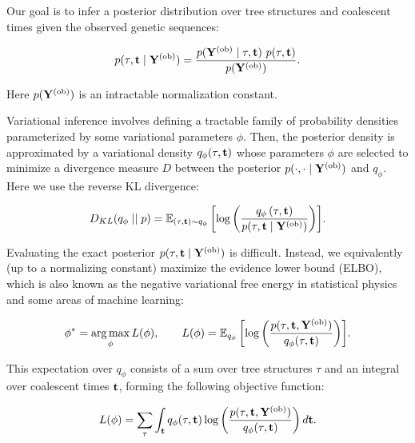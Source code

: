 Our goal is to infer a posterior distribution over tree structures and coalescent times given the observed genetic sequences: 

\begin{equation}
    p(\tau, \mathbf{t} \mid \mathbf{Y}^{{(\text{ob})}}) = \frac{p(\mathbf{Y}^{{(\text{ob})}} \mid \tau, \mathbf{t}) ~ p(\tau, \mathbf{t})}{p(\mathbf{Y}^{{(\text{ob})}})}.
\end{equation}

Here $p(\mathbf{Y}^{{(\text{ob})}})$ is an intractable normalization constant.

Variational inference involves defining a tractable family of probability densities parameterized by some variational parameters $\phi$. Then, the posterior density is approximated by a variational density $q_{\phi} (\tau, \mathbf{t})$ whose parameters $\phi$ are selected to minimize a divergence measure $D$ between the posterior $p(\cdot, \cdot \mid \mathbf{Y}^{{(\text{ob})}})$ and $q_{\phi}$. Here we use the reverse KL divergence:

\begin{equation}
    D_{KL}(q_{\phi} \mid \mid p) = \mathbb{E}_{(\tau,\mathbf{t}) \sim q_{\phi}}\left[\log\left(\frac{q_{\phi}\left(\tau,\mathbf{t}\right)}{p(\tau,\mathbf{t} \mid \mathbf{Y}^{{(\text{ob})}})}\right)\right]\!.
\end{equation}

Evaluating the exact posterior $p(\tau,\mathbf{t} \mid \mathbf{Y}^{{(\text{ob})}})$ is difficult. Instead, we equivalently (up to a normalizing constant) maximize the evidence lower bound (ELBO), which is also known as the negative variational free energy in statistical physics and some areas of machine learning:

\begin{align}
     \phi^* = \operatorname*{arg\,max}_{\phi} L(\phi), \qquad L(\phi) = \mathbb{E}_{q_{\phi}}\left[\log\left(\frac{p(\tau,\mathbf{t},\mathbf{Y}^{{(\text{ob})}})}{q_\phi(\tau,\mathbf{t})}\right)\right]\!.
    \label{eqn:ELBO} 
\end{align}

This expectation over $q_{\phi}$ consists of a sum over tree structures $\tau$ and an integral over coalescent times $\mathbf{t}$, forming the following objective function:

\begin{equation}
     L(\phi) = \sum_{\tau} \int_{\mathbf{t}} q_{\phi}(\tau,\mathbf{t}) \log\left(\frac{p(\tau,\mathbf{t},\mathbf{Y}^{{(\text{ob})}})}{q_\phi(\tau,\mathbf{t})}\right) d\mathbf{t}.
    \label{eqn:ELBO_int} 
\end{equation}

